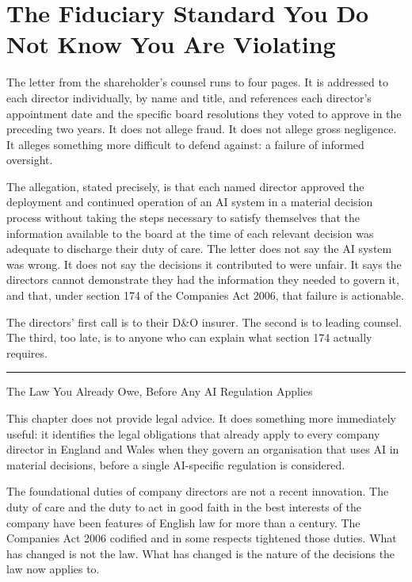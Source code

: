 
\chapter{The Fiduciary Standard You Do Not Know You Are Violating}

The letter from the shareholder's counsel runs to four pages. It is addressed to each director individually, by name and title, and references each director's appointment date and the specific board resolutions they voted to approve in the preceding two years. It does not allege fraud. It does not allege gross negligence. It alleges something more difficult to defend against: a failure of informed oversight.

The allegation, stated precisely, is that each named director approved the deployment and continued operation of an AI system in a material decision process without taking the steps necessary to satisfy themselves that the information available to the board at the time of each relevant decision was adequate to discharge their duty of care. The letter does not say the AI system was wrong. It does not say the decisions it contributed to were unfair. It says the directors cannot demonstrate they had the information they needed to govern it, and that, under section 174 of the Companies Act 2006, that failure is actionable.

The directors' first call is to their D\&O insurer. The second is to leading counsel. The third, too late, is to anyone who can explain what section 174 actually requires.

\begin{center}\rule{0.5\linewidth}{0.5pt}\end{center}

The Law You Already Owe, Before Any AI Regulation Applies

This chapter does not provide legal advice. It does something more immediately useful: it identifies the legal obligations that already apply to every company director in England and Wales when they govern an organisation that uses AI in material decisions, before a single AI-specific regulation is considered.

The foundational duties of company directors are not a recent innovation. The duty of care and the duty to act in good faith in the best interests of the company have been features of English law for more than a century. The Companies Act 2006 codified and in some respects tightened those duties. What has changed is not the law. What has changed is the nature of the decisions the law now applies to.

